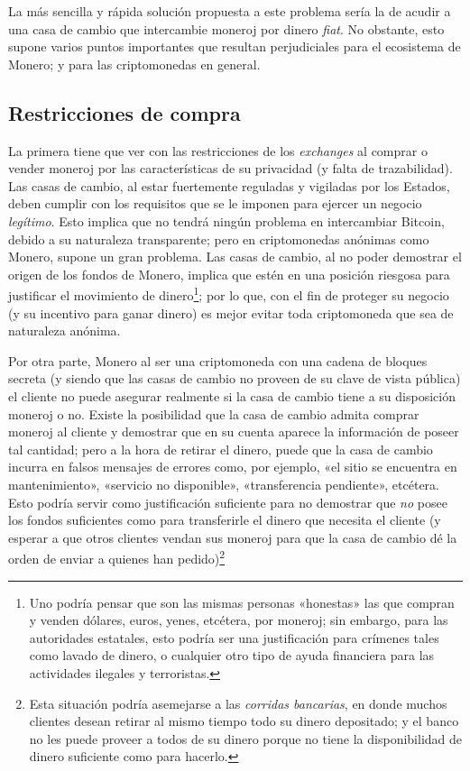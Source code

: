 \documentclass[12pt,a4paper,twoside]{book}
\begin{document}
La más sencilla y rápida solución propuesta a este problema sería la de acudir a una casa de cambio que intercambie moneroj por dinero \textit{fiat}. No obstante, esto supone varios puntos importantes que resultan perjudiciales para el ecosistema de Monero; y para las criptomonedas en general.

\subsection{Restricciones de compra}
La primera tiene que ver con las restricciones de los \textit{exchanges} al comprar o vender moneroj por las características de su privacidad (y falta de trazabilidad). Las casas de cambio, al estar fuertemente reguladas y vigiladas por los Estados, deben cumplir con los requisitos que se le imponen para ejercer un negocio \textit{legítimo}. Esto implica que no tendrá ningún problema en intercambiar Bitcoin, debido a su naturaleza transparente; pero en criptomonedas anónimas como Monero, supone un gran problema. Las casas de cambio, al no poder demostrar el origen de los fondos de Monero, implica que estén en una posición riesgosa para justificar el movimiento de dinero\footnote{Uno podría pensar que son las mismas personas «honestas» las que compran y venden dólares, euros, yenes, etcétera, por moneroj; sin embargo, para las autoridades estatales, esto podría ser una justificación para crímenes tales como lavado de dinero, o cualquier otro tipo de ayuda financiera para las actividades ilegales y terroristas.}; por lo que, con el fin de proteger su negocio (y su incentivo para ganar dinero) es mejor evitar toda criptomoneda que sea de naturaleza anónima.

Por otra parte, Monero al ser una criptomoneda con una cadena de bloques secreta (y siendo que las casas de cambio no proveen de su clave de vista pública) el cliente no puede asegurar realmente si la casa de cambio tiene a su disposición moneroj o no. Existe la posibilidad que la casa de cambio admita comprar moneroj al cliente y demostrar que en su cuenta aparece la información de poseer tal cantidad; pero a la hora de retirar el dinero, puede que la casa de cambio incurra en falsos mensajes de errores como, por ejemplo, «el sitio se encuentra en mantenimiento», «servicio no disponible», «transferencia pendiente», etcétera. Esto podría servir como justificación suficiente para no demostrar que \textit{no} posee los fondos suficientes como para transferirle el dinero que necesita el cliente (y esperar a que otros clientes vendan sus moneroj para que la casa de cambio dé la orden de enviar a quienes han pedido)\footnote{Esta situación podría asemejarse a las \textit{corridas bancarias}, en donde muchos clientes desean retirar al mismo tiempo todo su dinero depositado; y el banco no les puede proveer a todos de su dinero porque no tiene la disponibilidad de dinero suficiente como para hacerlo.}
\end{document}

